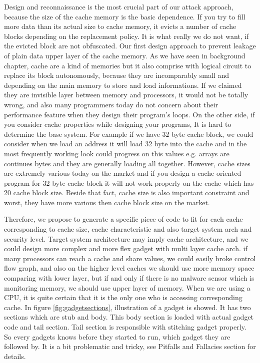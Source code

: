 	    Design and reconnaissance is the most crucial part of our attack approach, because the size of the cache memory is the basic dependence. If you try to fill more data than its actual size to cache memory, it evicts a number of cache blocks depending on the replacement policy. It is what really we do not want, if the evicted block are not obfuscated. Our first design approach to prevent leakage of plain data upper layer of the cache memory. As we have seen in background chapter, cache are a kind of memories but it also comprise with logical circuit to replace its block autonomously, because they are incomparably small and depending on the main memory to store and load informations. If we claimed they are invisible layer between memory and processors, it would not be totally wrong, and also many programmers today do not concern about their performance feature when they design their program's loops. On the other side, if you consider cache properties while designing your programs, It is hard to determine the base system. For example if we have 32 byte cache block, we could consider when we load an address it will load 32 byte into the cache and in the most frequently working look could progress on this values e.g. arrays are continues bytes and they are generally loading all together. However, cache sizes are extremely various today on the market and if you design a cache oriented program for 32 byte cache block it will not work properly on the cache which has 20 cache block size. Beside that fact, cache size is also important constraint and worst, they have more various then cache block size on the market.

	    Therefore, we propose to generate a specific piece of code to fit for each cache corresponding to cache size, cache characteristic and also target system  arch and security level. Target system architecture may imply cache architecture, and we could design more complex and more flex gadget with multi layer cache arch. if many processors can reach a cache and share values, we could easily broke control flow graph\cite{ramilli2011multiprocess}, and also on the higher level caches we should use more memory space comparing with lower layer, but if and only if there is no malware sensor which is monitoring memory, we should use upper layer of memory. When we are using a CPU, it is quite certain that it is the only one who is accessing corresponding cache. In figure \ref{fig:gadgetsections}, illustration of a gadget is showed. It has two sections which are stub and body. This body section is loaded with actual gadget code and tail section. Tail section is responsible with stitching gadget properly. So every gadgets knows before they started to run, which gadget they are followed by. It is a bit problematic and tricky, see Pitfalls and Fallacies section for details.

